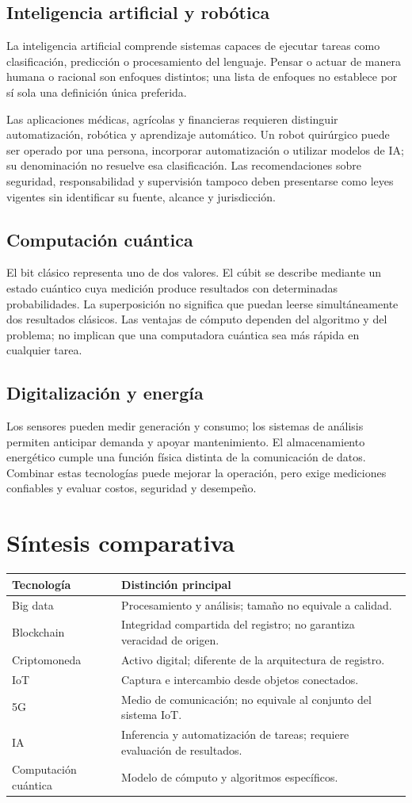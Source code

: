 {\subsection{Inteligencia artificial y robótica}
La inteligencia artificial comprende sistemas capaces de ejecutar tareas como clasificación, predicción o procesamiento del lenguaje. Pensar o actuar de manera humana o racional son enfoques distintos; una lista de enfoques no establece por sí sola una definición única preferida.
\par
Las aplicaciones médicas, agrícolas y financieras requieren distinguir automatización, robótica y aprendizaje automático. Un robot quirúrgico puede ser operado por una persona, incorporar automatización o utilizar modelos de IA; su denominación no resuelve esa clasificación. Las recomendaciones sobre seguridad, responsabilidad y supervisión tampoco deben presentarse como leyes vigentes sin identificar su fuente, alcance y jurisdicción.
\subsection{Computación cuántica}
El bit clásico representa uno de dos valores. El cúbit se describe mediante un estado cuántico cuya medición produce resultados con determinadas probabilidades. La superposición no significa que puedan leerse simultáneamente dos resultados clásicos. Las ventajas de cómputo dependen del algoritmo y del problema; no implican que una computadora cuántica sea más rápida en cualquier tarea.
\subsection{Digitalización y energía}
Los sensores pueden medir generación y consumo; los sistemas de análisis permiten anticipar demanda y apoyar mantenimiento. El almacenamiento energético cumple una función física distinta de la comunicación de datos. Combinar estas tecnologías puede mejorar la operación, pero exige mediciones confiables y evaluar costos, seguridad y desempeño.
\section{Síntesis comparativa}
\noindent\begin{tabularx}{\textwidth}{@{}p{}X@{}}\toprule
Tecnología & Distinción principal\\\midrule
Big data & Procesamiento y análisis; tamaño no equivale a calidad.\\
Blockchain & Integridad compartida del registro; no garantiza veracidad de origen.\\
Criptomoneda & Activo digital; diferente de la arquitectura de registro.\\
IoT & Captura e intercambio desde objetos conectados.\\
5G & Medio de comunicación; no equivale al conjunto del sistema IoT.\\
IA & Inferencia y automatización de tareas; requiere evaluación de resultados.\\
Computación cuántica & Modelo de cómputo y algoritmos específicos.\\\bottomrule
\end{tabularx}
}
